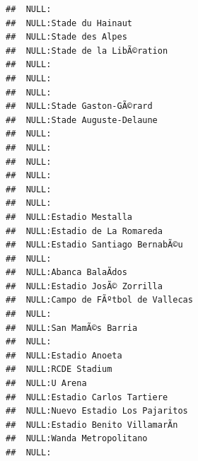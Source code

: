 \documentclass{article}\usepackage[]{graphicx}\usepackage[]{color}
\makeatletter
\newenvironment{kframe}{%
 \def\at@end@of@kframe{}%
 \ifinner\ifhmode%
  \def\at@end@of@kframe{\end{minipage}}%
  \begin{minipage}{\columnwidth}%
 \fi\fi%
 \def\FrameCommand##1{\hskip\@totalleftmargin \hskip-\fboxsep
 \colorbox{shadecolor}{##1}\hskip-\fboxsep
     \hskip-\linewidth \hskip-\@totalleftmargin \hskip\columnwidth}%
 \MakeFramed {\advance\hsize-\width
   \@totalleftmargin\z@ \linewidth\hsize
   \@setminipage}}%
 {\par\unskip\endMakeFramed%
 \at@end@of@kframe}
\newenvironment{knitrout}{}{} %
\makeatother
\begin{document}
\begin{knitrout}
\begin{kframe}
\begin{verbatim}
##  NULL:                                                                       
##  NULL:Stade du Hainaut                                                       
##  NULL:Stade des Alpes                                                        
##  NULL:Stade de la LibÃ©ration                                                
##  NULL:                                                                       
##  NULL:                                                                       
##  NULL:                                                                       
##  NULL:Stade Gaston-GÃ©rard                                                   
##  NULL:Stade Auguste-Delaune                                                  
##  NULL:                                                                       
##  NULL:                                                                       
##  NULL:                                                                       
##  NULL:                                                                       
##  NULL:                                                                       
##  NULL:                                                                       
##  NULL:Estadio Mestalla                                                       
##  NULL:Estadio de La Romareda                                                 
##  NULL:Estadio Santiago BernabÃ©u                                             
##  NULL:                                                                       
##  NULL:Abanca BalaÃ­dos                                                       
##  NULL:Estadio JosÃ© Zorrilla                                                 
##  NULL:Campo de FÃºtbol de Vallecas                                           
##  NULL:                                                                       
##  NULL:San MamÃ©s Barria                                                      
##  NULL:                                                                       
##  NULL:Estadio Anoeta                                                         
##  NULL:RCDE Stadium                                                           
##  NULL:U Arena                                                                
##  NULL:Estadio Carlos Tartiere                                                
##  NULL:Nuevo Estadio Los Pajaritos                                            
##  NULL:Estadio Benito VillamarÃ­n                                             
##  NULL:Wanda Metropolitano                                                    
##  NULL:                                                                       

\end{verbatim}
\end{kframe}
\end{knitrout}
\end{document}
